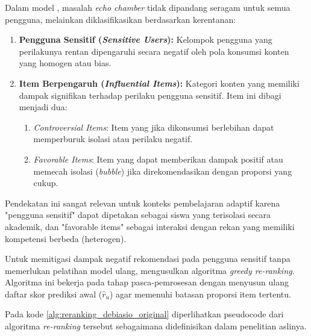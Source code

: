 Dalam model \textcite{DeBiasio2023}, masalah \textit{echo chamber} tidak dipandang seragam untuk semua pengguna, melainkan diklasifikasikan berdasarkan kerentanan:
\begin{enumerate}
    \item \textbf{Pengguna Sensitif (\textit{Sensitive Users}):} Kelompok pengguna yang perilakunya rentan dipengaruhi secara negatif oleh pola konsumsi konten yang homogen atau bias.
    \item \textbf{Item Berpengaruh (\textit{Influential Items}):} Kategori konten yang memiliki dampak signifikan terhadap perilaku pengguna sensitif. Item ini dibagi menjadi dua:
    \begin{enumerate}
        \item \textit{Controversial Items}: Item yang jika dikonsumsi berlebihan dapat memperburuk isolasi atau perilaku negatif.
        \item \textit{Favorable Items}: Item yang dapat memberikan dampak positif atau memecah isolasi (\textit{bubble}) jika direkomendasikan dengan proporsi yang cukup.
    \end{enumerate}
\end{enumerate}

Pendekatan ini sangat relevan untuk konteks pembelajaran adaptif karena "pengguna sensitif" dapat dipetakan sebagai siswa yang terisolasi secara akademik, dan "favorable items" sebagai interaksi dengan rekan yang memiliki kompetensi berbeda (heterogen).

Untuk memitigasi dampak negatif rekomendasi pada pengguna sensitif tanpa memerlukan pelatihan model ulang, \textcite{DeBiasio2023} mengusulkan algoritma \textit{greedy re-ranking}. Algoritma ini bekerja pada tahap pasca-pemrosesan dengan menyusun ulang daftar skor prediksi awal ($\hat{r}_u$) agar memenuhi batasan proporsi item tertentu.

Pada kode \ref{alg:reranking_debiasio_original} diperlihatkan pseudocode dari algoritma \textit{re-ranking} tersebut sebagaimana didefinisikan dalam penelitian aslinya.

